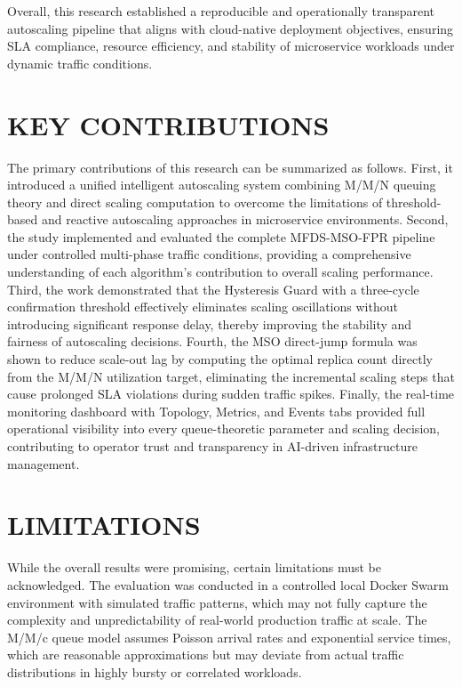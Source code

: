 Overall, this research established a reproducible and 
operationally transparent autoscaling pipeline that aligns with 
cloud-native deployment objectives, ensuring SLA compliance, 
resource efficiency, and stability of microservice workloads 
under dynamic traffic conditions.

\section{\uppercase{Key Contributions}}

The primary contributions of this research can be summarized as 
follows. First, it introduced a unified intelligent autoscaling 
system combining M/M/N queuing theory and direct scaling 
computation to overcome the limitations of threshold-based and 
reactive autoscaling approaches in microservice environments. 
Second, the study implemented and evaluated the complete 
MFDS-MSO-FPR pipeline under controlled multi-phase traffic 
conditions, providing a comprehensive understanding of each 
algorithm's contribution to overall scaling performance. Third, 
the work demonstrated that the Hysteresis Guard with a 
three-cycle confirmation threshold effectively eliminates scaling 
oscillations without introducing significant response delay, 
thereby improving the stability and fairness of autoscaling 
decisions. Fourth, the MSO direct-jump formula was shown to 
reduce scale-out lag by computing the optimal replica count 
directly from the M/M/N utilization target, eliminating the 
incremental scaling steps that cause prolonged SLA violations 
during sudden traffic spikes. Finally, the real-time monitoring 
dashboard with Topology, Metrics, and Events tabs provided full 
operational visibility into every queue-theoretic parameter and 
scaling decision, contributing to operator trust and 
transparency in AI-driven infrastructure management.

\section{\uppercase{Limitations}}

While the overall results were promising, certain limitations must be acknowledged. The evaluation was conducted in a controlled local Docker Swarm environment with simulated traffic patterns, which may not fully capture the complexity and unpredictability of real-world production traffic at scale. The M/M/c queue model assumes Poisson arrival rates and exponential service times, which are reasonable approximations but may deviate from actual traffic distributions in highly bursty or correlated workloads.

